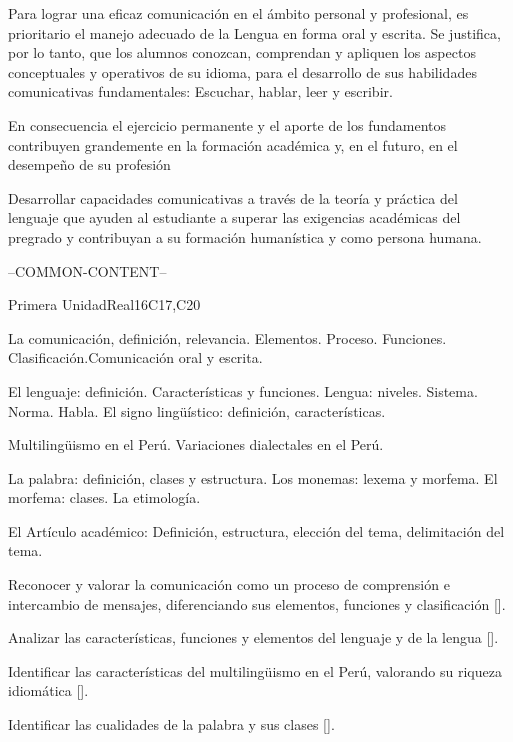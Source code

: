 \begin{syllabus}


\begin{justification}
Para lograr una eficaz comunicación en el ámbito personal y profesional, 
es prioritario el manejo adecuado de la Lengua en forma oral y escrita. 
Se justifica, por lo tanto, que los alumnos conozcan, comprendan y apliquen 
los aspectos conceptuales y operativos de su idioma, para el desarrollo 
de sus habilidades comunicativas fundamentales: Escuchar, hablar, leer y escribir.

En consecuencia el ejercicio permanente y el aporte de los fundamentos 
contribuyen grandemente en la formación académica y, en el futuro, 
en el desempeño de su profesión
\end{justification}

\begin{goals}
\item Desarrollar capacidades comunicativas a través de la teoría y práctica del lenguaje que ayuden al estudiante a superar las exigencias académicas del pregrado y contribuyan a su formación humanística y como persona humana.
\end{goals}

--COMMON-CONTENT--

\begin{unit}{Primera Unidad}{}{Real}{16}{C17,C20}
\begin{topics}
      \item La comunicación, definición, relevancia. Elementos. Proceso. Funciones. Clasificación.Comunicación oral y escrita.
      \item El lenguaje: definición. Características y funciones. Lengua: niveles. Sistema. Norma. Habla. El signo lingüístico: definición, características.
      \item Multilingüismo en el Perú. Variaciones dialectales en el Perú.
      \item La palabra: definición, clases y estructura. Los monemas: lexema y morfema. El morfema: clases. La etimología.
      \item El Artículo académico: Definición, estructura, elección del tema, delimitación del tema.
\end{topics}

\begin{learningoutcomes}
   \item Reconocer y valorar la comunicación como un proceso de comprensión e intercambio de mensajes, diferenciando sus elementos, funciones y clasificación [\Usage].
   \item Analizar las características, funciones y elementos del lenguaje y de la lengua [\Usage].
   \item Identificar las características del multilingüismo en el Perú, valorando su riqueza idiomática [\Usage].
   \item Identificar las cualidades de la palabra y sus clases [\Usage].
\end{learningoutcomes}
\end{unit}


\end{syllabus}
